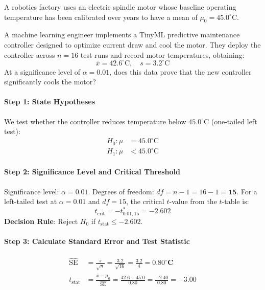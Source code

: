 \begin{example}
A robotics factory uses an electric spindle motor whose baseline operating temperature has been calibrated over years to have a mean of $\mu_0 = 45.0^\circ\text{C}$.

A machine learning engineer implements a TinyML predictive maintenance controller designed to optimize current draw and cool the motor. They deploy the controller across $n = 16$ test runs and record motor temperatures, obtaining:
\begin{equation*}
\bar{x} = 42.6^\circ\text{C}, \quad s = 3.2^\circ\text{C}
\end{equation*}
At a significance level of $\alpha = 0.01$, does this data prove that the new controller significantly cools the motor?

\paragraph{Step 1: State Hypotheses}
We test whether the controller reduces temperature below $45.0^\circ\text{C}$ (one-tailed left test):
\begin{align*}
H_0: \mu &= 45.0^\circ\text{C} \\
H_1: \mu &< 45.0^\circ\text{C}
\end{align*}

\paragraph{Step 2: Significance Level and Critical Threshold}
Significance level: $\alpha = 0.01$. Degrees of freedom: $df = n - 1 = 16 - 1 = \mathbf{15}$.
For a left-tailed test at $\alpha = 0.01$ and $df = 15$, the critical $t$-value from the $t$-table is:
\begin{equation*}
t_{\text{crit}} = -t_{0.01, 15}^* = \mathbf{-2.602}
\end{equation*}
\textbf{Decision Rule}: Reject $H_0$ if $t_{\text{stat}} \le -2.602$.

\paragraph{Step 3: Calculate Standard Error and Test Statistic}
\begin{align*}
\widehat{\text{SE}} &= \frac{s}{\sqrt{n}} = \frac{3.2}{\sqrt{16}} = \frac{3.2}{4} = \mathbf{0.80^\circ\text{C}} \\
t_{\text{stat}} &= \frac{\bar{x} - \mu_0}{\widehat{\text{SE}}} = \frac{42.6 - 45.0}{0.80} = \frac{-2.40}{0.80} = \mathbf{-3.00}
\end{align*}


\end{example}
